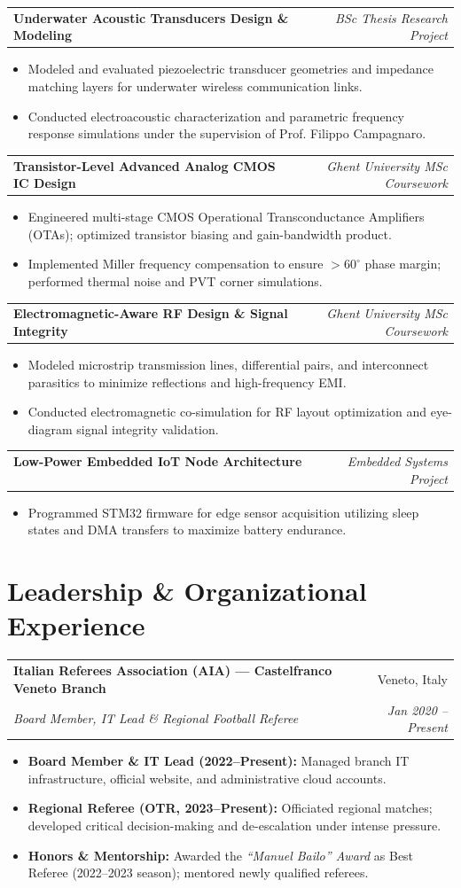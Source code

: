 \documentclass[10pt,a4paper]{article}
\makeatletter
\newcommand{\resumeItem}[1]{%
  \item\small{{#1}\vspace{-1.5pt}}%
}
\newcommand{\resumeSubheading}[4]{%
  \vspace{1pt}
  \noindent\begin{tabular*}{\textwidth}[t]{@{}l@{\extracolsep{\fill}}r@{}}
    \textbf{#1} & \textcolor{secondary}{\small #2} \\
    \textit{\small #3} & \textcolor{secondary}{\textit{\small #4}} \\
  \end{tabular*}\vspace{-3pt}
}
\newcommand{\resumeProjectHeading}[2]{%
  \vspace{1pt}
  \noindent\begin{tabular*}{\textwidth}[t]{@{}l@{\extracolsep{\fill}}r@{}}
    \textbf{#1} & \textcolor{secondary}{\textit{\small #2}} \\
  \end{tabular*}\vspace{-3pt}
}
\newcommand{\resumeItemListStart}{\begin{itemize}[leftmargin=1.15em, itemsep=1.3pt, topsep=1pt, parsep=0pt]}
\newcommand{\resumeItemListEnd}{\end{itemize}\vspace{1.5pt}}
\makeatother
\begin{document}
\resumeProjectHeading
  {\textbf{Underwater Acoustic Transducers Design \& Modeling} \ \textbar\ \ \normalfont{\textit{Acoustics, Materials, Transduction}}}{BSc Thesis Research Project}
  \resumeItemListStart
    \resumeItem{Modeled and evaluated piezoelectric transducer geometries and impedance matching layers for underwater wireless communication links.}
    \resumeItem{Conducted electroacoustic characterization and parametric frequency response simulations under the supervision of Prof. Filippo Campagnaro.}
  \resumeItemListEnd

\resumeProjectHeading
  {\textbf{Transistor-Level Advanced Analog CMOS IC Design} \ \textbar\ \ \normalfont{\textit{Cadence / SPICE, OTA, Analog IC}}}{Ghent University MSc Coursework}
  \resumeItemListStart
    \resumeItem{Engineered multi-stage CMOS Operational Transconductance Amplifiers (OTAs); optimized transistor biasing and gain-bandwidth product.}
    \resumeItem{Implemented Miller frequency compensation to ensure $>60^\circ$ phase margin; performed thermal noise and PVT corner simulations.}
  \resumeItemListEnd

\resumeProjectHeading
  {\textbf{Electromagnetic-Aware RF Design \& Signal Integrity} \ \textbar\ \ \normalfont{\textit{RF Layout, Transmission Lines, SI}}}{Ghent University MSc Coursework}
  \resumeItemListStart
    \resumeItem{Modeled microstrip transmission lines, differential pairs, and interconnect parasitics to minimize reflections and high-frequency EMI.}
    \resumeItem{Conducted electromagnetic co-simulation for RF layout optimization and eye-diagram signal integrity validation.}
  \resumeItemListEnd

\resumeProjectHeading
  {\textbf{Low-Power Embedded IoT Node Architecture} \ \textbar\ \ \normalfont{\textit{STM32, C, Low-Power, Sensor Telemetry}}}{Embedded Systems Project}
  \resumeItemListStart
    \resumeItem{Programmed STM32 firmware for edge sensor acquisition utilizing sleep states and DMA transfers to maximize battery endurance.}
  \resumeItemListEnd

\section{Leadership \& Organizational Experience}

\resumeSubheading
  {Italian Referees Association (AIA) --- Castelfranco Veneto Branch}{Veneto, Italy}
  {Board Member, IT Lead \& Regional Football Referee}{Jan 2020 -- Present}
  \resumeItemListStart
    \resumeItem{\textbf{Board Member \& IT Lead (2022--Present):} Managed branch IT infrastructure, official website, and administrative cloud accounts.}
    \resumeItem{\textbf{Regional Referee (OTR, 2023--Present):} Officiated regional matches; developed critical decision-making and de-escalation under intense pressure.}
    \resumeItem{\textbf{Honors \& Mentorship:} Awarded the \textit{``Manuel Bailo'' Award} as Best Referee (2022--2023 season); mentored newly qualified referees.}
  \resumeItemListEnd
\end{document}
